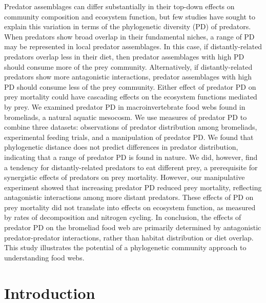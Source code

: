 \documentclass[11pt]{article}
\begin{document}
Predator assemblages can differ substantially in their top-down effects on
community composition and ecosystem function, but few studies have sought to
explain this variation in terms of the phylogenetic diversity (PD) of
predators. When predators show broad overlap in their fundamental niches, a
range of PD may be represented in local predator assemblages. In this case, if
distantly-related predators overlap less in their diet, then predator
assemblages with high PD should consume more of the prey community.
Alternatively, if distantly-related predators show more antagonistic
interactions, predator assemblages with high PD should consume less of the
prey community. Either effect of predator PD on prey mortality could have
cascading effects on the ecosystem functions mediated by prey. We examined
predator PD in macroinvertebrate food webs found in bromeliads, a natural
aquatic mesocosm. We use measures of predator PD to combine three datasets:
observations of predator distribution among bromeliads, experimental feeding
trials, and a manipulation of predator PD. We found that phylogenetic distance
does not predict differences in predator distribution, indicating that a range
of predator PD is found in nature. We did, however, find a tendency for
distantly-related predators to eat different prey, a prerequisite for
synergistic effects of predators on prey mortality. However, our manipulative
experiment showed that increasing predator PD reduced prey mortality,
reflecting antagonistic interactions among more distant predators. These
effects of PD on prey mortality did not translate into effects on ecosystem
function, as measured by rates of decomposition and nitrogen cycling. In
conclusion, the effects of predator PD on the bromeliad food web are primarily
determined by antagonistic predator-predator interactions, rather than habitat
distribution or diet overlap. This study illustrates the potential of a
phylogenetic community approach to understanding food webs.


\newpage{}

\section*{Introduction}

\end{document}
